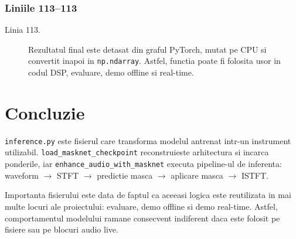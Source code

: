 \documentclass[12pt,a4paper]{report}
\newcommand{\codechunk}[2]{%
\subsection*{Liniile #1--#2}

}
\begin{document}
\codechunk{113}{113}

\begin{description}
    \item[Linia 113.] Rezultatul final este detasat din graful PyTorch, mutat pe
    CPU si convertit inapoi in \texttt{np.ndarray}. Astfel, functia poate fi folosita
    usor in codul DSP, evaluare, demo offline si real-time.
\end{description}

\chapter{Concluzie}

\texttt{inference.py} este fisierul care transforma modelul antrenat intr-un
instrument utilizabil. \texttt{load\_masknet\_checkpoint} reconstruieste arhitectura
si incarca ponderile, iar \texttt{enhance\_audio\_with\_masknet} executa pipeline-ul
de inferenta: waveform \(\rightarrow\) STFT \(\rightarrow\) predictie masca
\(\rightarrow\) aplicare masca \(\rightarrow\) ISTFT.

Importanta fisierului este data de faptul ca aceeasi logica este reutilizata in
mai multe locuri ale proiectului: evaluare, demo offline si demo real-time.
Astfel, comportamentul modelului ramane consecvent indiferent daca este folosit
pe fisiere sau pe blocuri audio live.
\end{document}
